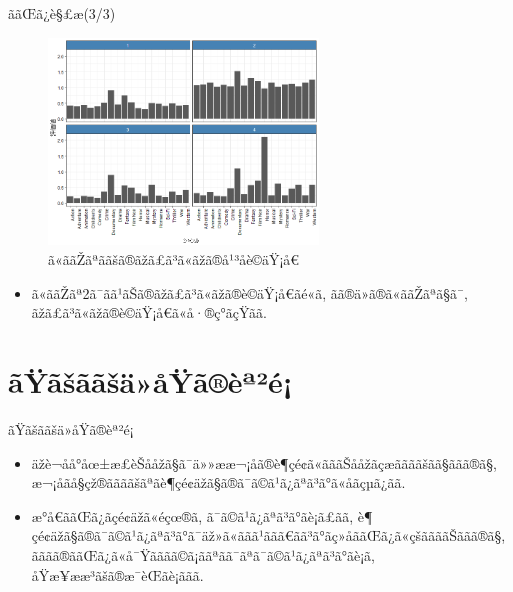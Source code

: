 \documentclass[dvipdfmx]{beamer} %
\begin{document}
\begin{frame}{ããŒã¿è§£æ(3/3)}
\begin{figure}[tbp]
\begin{center}
\includegraphics[clip,height= 55mm]{data/cluster_plot.png}
\end{center}
\caption{ã«ããŽãªããšã®ãžã£ã³ã«ãžã®å¹³åè©äŸ¡å€}
\label{clustergenre}
\end{figure}

\begin{itemize}
	\item ã«ããŽãª2ã¯ãã¹ãŠã®ãžã£ã³ã«ãžã®è©äŸ¡å€ãé«ã, ãã®ä»ã®ã«ããŽãªã§ã¯, ãžã£ã³ã«ãžã®è©äŸ¡å€ã«å·®ç°ãçŸãã.
\end{itemize}
\end{frame}

\section{ãŸãšããšä»åŸã®èª²é¡}
\begin{frame}{ãŸãšããšä»åŸã®èª²é¡}

\begin{itemize}

\item
äžè¬åå°åœ±æ­£èŠååžã§ã¯ä»»ææ¬¡åã®è¶çé¢ã«ãããŠååžãçæããããšãã§ããã®ã§, æ¬¡åãå§çž®ããããšãªãè¶çé¢äžã§ã®ã¯ã©ã¹ã¿ãªã³ã°ã«åãçµã¿ãã. 

\vspace{0.2cm}
\item
æ°å€ããŒã¿ãçé¢äžã«éçœ®ã, ã¯ã©ã¹ã¿ãªã³ã°ãè¡ã£ãã, è¶çé¢äžã§ã®ã¯ã©ã¹ã¿ãªã³ã°ã¯äž»ã«ãã­ã¹ããã€ãã³ã°ãç»åããŒã¿ã«çšããããŠããã®ã§, ãããã®ããŒã¿ã«å¯Ÿãããã©ã¡ããªãã¯ãªã¯ã©ã¹ã¿ãªã³ã°ãè¡ã, åŸæ¥ææ³ãšã®æ¯èŒãè¡ããã. 

\end{itemize}

\end{frame}
\end{document}
